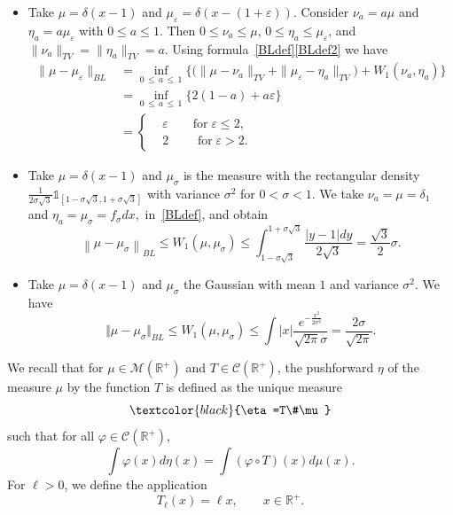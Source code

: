 \documentclass[10pt]{amsart}
\theoremstyle{definition}\newtheorem{defi}[theo]{Definition}\newtheorem{rema}[theo]{Remark}\newtheorem{exam}[theo]{Example}\newtheorem{exem}[theo]{Example}\newtheorem{nota}[theo]{Notation}
\newcommand*\dst{\displaystyle}
\newcommand*\eps{\varepsilon}
\newcommand*\R{\mathbb{R}}
\newcommand*\M{\mathcal{M}}
\newcommand*\f{\frac}
\newcommand{\clC}{\mathcal{C}}
\newcommand{\MT}[1]{\textcolor{black}{#1}}
\begin{document}
\begin{itemize}
\item Take $\mu=\delta(x-1)$ and $\mu_{\eps}=\delta(x-(1+\eps))$. Consider $\nu_a = a \mu$ and $\eta_a= a \mu_{\eps}$ with $0\leq a \leq 1$. Then $0 \leq \nu_a \leq \mu$, $0 \leq \eta_a \leq \mu_{\eps}$, and $\|\nu_a\|_{TV} =\|\eta_a\|_{TV} =a$. Using formula~\eqref{BLdef}\eqref{BLdef2} we have
\begin{equation*}
\begin{aligned}
\|\mu-\mu_{\eps}\|_{BL}& = \inf\limits_{0\,\leq\,a\,\leq\,1}
\Big\{\big(\|\mu-\nu_a\|_{TV} +\|\mu_{\eps}-\eta_a\|_{TV}\big) + W_1(\nu_a,\eta_a)
\Big\} \\
& = \inf\limits_{0\,\leq\,a\,\leq\,1}
\Big\{2(1-a) + a \eps
\Big\} \\
&=
\begin{cases}
& \eps\qquad\text{for}\;\eps\leq 2, \\
&2 \qquad \text{ for}\;\eps>2.
\end{cases}
\end{aligned}
\end{equation*}

\item Take $\mu=\delta(x-1)$ and $\mu_{\sigma}$ is the measure with the rectangular density $\f{1}{2\sigma\sqrt{3}}\mathbb{1}_{[1-\sigma\sqrt{3},1+\sigma\sqrt{3}]}$ with variance $\sigma^2$ for $0<\sigma<1$. We take $\nu_a=\mu=\delta_1$ and $\eta_a=\mu_\sigma=f_\sigma dx,$ in~\eqref{BLdef}, and obtain
\begin{equation*}
\left\|\mu-\mu_{\sigma}\right\|_{BL} \leq W_1(\mu,\mu_\sigma)\leq\int_{1-\sigma \sqrt{3}}^{1+\sigma \sqrt{3}} \f{\vert y-1 \vert dy}{2\sqrt{3}}=\f{\sqrt{3}}{2}\sigma.
\end{equation*}
\item Take $\mu=\delta(x-1)$ and $\mu_\sigma$ the Gaussian with mean $1$ and variance $\sigma^2.$ We have
\[
\Vert \mu - \mu_\sigma\Vert_{BL} \leq W_1(\mu,\mu_\sigma) \leq \int \vert x \vert \f{e^{-\f{x^2}{2\sigma^2}}}{\sqrt{2\pi}\sigma}=\f{2\sigma}{\sqrt{2\pi}}.
\]
\end{itemize}

We recall that for $\mu\in\M(\R^+)$ and $T\in \clC(\R^+)$, the pushforward $\eta$ of the measure $\mu$ by the function $T$ is defined as the unique measure
\begin{equation*}
\MT{\eta=T\#\mu}
\end{equation*}
such that for all $\varphi \in \clC(\R^+)$,
\begin{equation*}
\dst\int \varphi(x) d\eta(x) = \dst\int (\varphi\circ T)(x) d\mu(x).
\end{equation*}
For $\ell>0$, we define the application
\begin{equation}\label{Tell}
T_{\ell}(x) = \ell x, \qquad x\in \R^+.
\end{equation}
\end{document}
